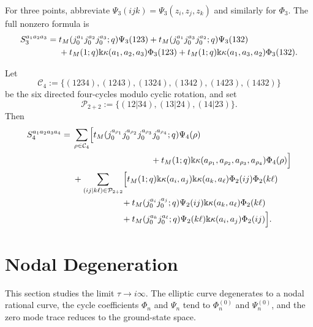 \documentclass[11pt,a4paper]{amsart}
\numberwithin{equation}{section}
\theoremstyle{definition}
\theoremstyle{remark}
\newcommand{\kk}{\Bbbk}
\newcommand{\ii}{i}
\begin{document}
For three points, abbreviate
$\Psi_3(ijk)=\Psi_3(z_i,z_j,z_k)$ and similarly for $\Phi_3$.  The full
nonzero formula is
\begin{align}
 S_3^{a_1a_2a_3}
={}&t_M(j_0^{a_1}j_0^{a_2}j_0^{a_3};q)\Psi_3(123)
 +t_M(j_0^{a_1}j_0^{a_3}j_0^{a_2};q)\Psi_3(132)\notag\\
 &+t_M(1;q)\kk\kappa(a_1,a_2,a_3)\Phi_3(123)
 +t_M(1;q)\kk\kappa(a_1,a_3,a_2)\Phi_3(132).
 \label{eq:S3-explicit}
\end{align}

Let
\begin{equation*}
 \mathcal C_4
 :=\{(1234),(1243),(1324),(1342),(1423),(1432)\}
\end{equation*}
be the six directed four-cycles modulo cyclic rotation, and set
\begin{equation*}
 \mathcal P_{2+2}:=\{(12|34),(13|24),(14|23)\}.
\end{equation*}
Then
\begin{align}
 S_4^{a_1a_2a_3a_4}
={}&\sum_{\rho\in\mathcal C_4}
 \Bigl[
 t_M(j_0^{a_{\rho_1}}j_0^{a_{\rho_2}}
 j_0^{a_{\rho_3}}j_0^{a_{\rho_4}};q)\Psi_4(\rho)
 \notag\\
 &\hspace{3.2cm}
 +t_M(1;q)\kk\kappa(a_{\rho_1},a_{\rho_2},a_{\rho_3},a_{\rho_4})
 \Phi_4(\rho)\Bigr]\notag\\
 &+\sum_{(ij|k\ell)\in\mathcal P_{2+2}}
 \Bigl[
 t_M(1;q)\kk\kappa(a_i,a_j)\kk\kappa(a_k,a_\ell)
 \Phi_2(ij)\Phi_2(k\ell)\notag\\
 &\hspace{2.0cm}
 +t_M(j_0^{a_i}j_0^{a_j};q)\Psi_2(ij)
 \kk\kappa(a_k,a_\ell)\Phi_2(k\ell)\notag\\
 &\hspace{2.0cm}
 +t_M(j_0^{a_k}j_0^{a_\ell};q)\Psi_2(k\ell)
 \kk\kappa(a_i,a_j)\Phi_2(ij)\Bigr].
 \label{eq:S4-explicit}
\end{align}

\section{Nodal Degeneration}
\label{sec:nodal-degeneration}

This section studies the limit $\tau\to \ii\infty$.  The elliptic curve degenerates to a nodal rational curve, the cycle coefficients $\Phi_n$ and $\Psi_n$ tend to $\Phi_n^{(0)}$ and $\Psi_n^{(0)}$, and the zero mode trace reduces to the ground-state space.
\end{document}
